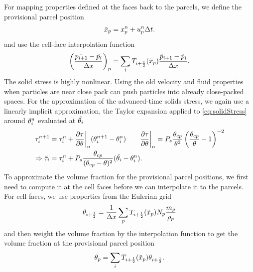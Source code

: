 For mapping properties defined at the faces back to the parcels, we define the provisional parcel position
\begin{equation}
    \label{eq:provPartPos}
    \tilde{x}_p = x_p^n + u_p^n \Delta t.
\end{equation}
and use the cell-face interpolation function
\begin{equation}
    \label{eq:cellFaceInterpolation}
    \left( \dfrac{\tilde{p_{i+1}} - \tilde{p_{i}}}{\Delta x} \right)_p = \sum_i T_{i+ \frac{1}{2}} (\tilde{x}_p ) \frac{\tilde{p}_{i+1} - \tilde{p}_i}{\Delta x}.
\end{equation}
The solid stress is highly nonlinear. Using the old velocity and fluid properties when particles are near close pack can push particles into already close-packed spaces.
For the approximation of the advanced-time solids stress, we again use a linearly implicit approximation, the Taylor expansion applied to \eqref{eq:solidStress} around $\theta_i^n$ evaluated at $\tilde{\theta_i}$
\begin{align}
    \tau_i^{n+1} &= \tau_i^n + \dfrac{\partial \tau}{\partial \theta}\bigg|_n  (\theta_i^{n+1} - \theta_i^n)  \qquad \dfrac{\partial \tau}{\partial \theta}\bigg|_n = P_s \dfrac{\theta_{cp}}{\theta^2} \left( \dfrac{\theta_{cp}}{\theta} -1 \right)^{-2}\\
    \Rightarrow \tilde{\tau}_i &= \tau_i^n + P_s\dfrac{\theta_{cp}}{(\theta_{cp} - \theta)^2} (\tilde{\theta_i}- \theta_i^n).
\end{align}
To approximate the volume fraction for the provisional parcel positions, we first need to compute it at the cell faces before we can interpolate it to the parcels. 
For cell faces, we use properties from the Eulerian grid
\begin{equation}
    \label{eq:interpolationPVFCellFace}
    \theta_{i+ \frac{1}{2}} = \dfrac{1}{\Delta x} \sum_p T_{i+\frac{1}{2}} (\tilde{x}_p ) N_p \dfrac{m_p}{\rho_p}
\end{equation}
and then weight the volume fraction by the interpolation function to get the volume fraction at the provisional parcel position
\begin{equation}
    \label{eq:interpolatePPP}
    \theta_p = \sum_i T_{i+\frac{1}{2}} (\tilde{x}_p) \theta_{i+\frac{1}{2}}.
\end{equation}

